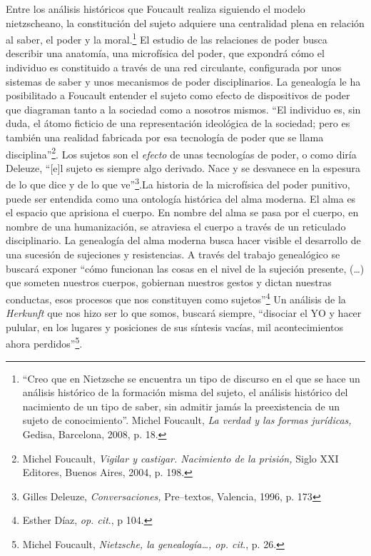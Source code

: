 Entre los análisis históricos que Foucault realiza siguiendo el modelo nietzscheano, la constitución del sujeto adquiere una centralidad plena en relación al saber, el poder y la moral.\footnote{\enquote{Creo que en Nietzsche se encuentra un tipo de discurso en el que se hace un análisis histórico de la formación misma del sujeto, el análisis histórico del nacimiento de un tipo de saber, sin admitir jamás la preexistencia de un sujeto de conocimiento}. Michel Foucault, \emph{La verdad y las formas jurídicas,} Gedisa, Barcelona, 2008, p. 18.} El estudio de las relaciones de poder busca describir una anatomía, una microfísica del poder, que expondrá cómo el individuo es constituido a través de una red circulante, configurada por unos sistemas de saber y unos mecanismos de poder disciplinarios. La genealogía le ha posibilitado a Foucault entender el sujeto como efecto de dispositivos de poder que diagraman tanto a la sociedad como a nosotros mismos. \enquote{El individuo es, sin duda, el átomo ficticio de una representación ideológica de la sociedad; pero es también una realidad fabricada por esa tecnología de poder que se llama disciplina}\footnote{Michel Foucault, \emph{Vigilar y castigar. Nacimiento de la prisión,} Siglo XXI Editores, Buenos Aires, 2004, p. 198.}. Los sujetos son el \emph{efecto} de unas tecnologías de poder, o como diría Deleuze, \enquote{{[}e{]}l sujeto es siempre algo derivado. Nace y se desvanece en la espesura de lo que dice y de lo que ve}\footnote{Gilles Deleuze, \emph{Conversaciones,} Pre--textos, Valencia, 1996, p. 173}.La historia de la microfísica del poder punitivo, puede ser entendida como una ontología histórica del alma moderna. El alma es el espacio que aprisiona el cuerpo. En nombre del alma se pasa por el cuerpo, en nombre de una humanización, se atraviesa el cuerpo a través de un reticulado disciplinario. La genealogía del alma moderna busca hacer visible el desarrollo de una sucesión de sujeciones y resistencias. A través del trabajo genealógico se buscará exponer \enquote{cómo funcionan las cosas en el nivel de la sujeción presente, (\dots) que someten nuestros cuerpos, gobiernan nuestros gestos y dictan nuestras conductas, esos procesos que nos constituyen como sujetos}\footnote{Esther Díaz, \emph{op. cit}., p 104.} Un análisis de la \emph{Herkunft} que nos hizo ser lo que somos, buscará siempre, \enquote{disociar el YO y hacer pulular, en los lugares y posiciones de sus síntesis vacías, mil acontecimientos ahora perdidos}\footnote{Michel Foucault, \emph{Nietzsche, la genealogía\ldots, op. cit}., p. 26.}.

